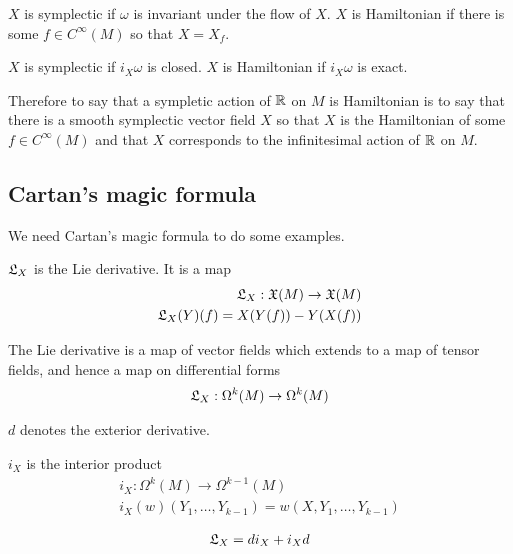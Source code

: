 \documentclass[12pt]{article}
\begin{document}
\begin{definition}
	$X$ is symplectic if $\omega$ is invariant under the flow of $X$.
	$X$ is Hamiltonian if there is some $f\in C^\infty(M)$ so that $X = X_f$.
\end{definition}

\begin{proposition}
	$X$ is symplectic if $i_X\omega$ is closed. $X$ is Hamiltonian if $i_X\omega$ is exact.
\end{proposition}
Therefore to say that a sympletic action of $\mathbb{R}$ on $M$ is Hamiltonian
is to say that there is a smooth symplectic vector field $X$ so that $X$ is the
Hamiltonian of some $f\in C^\infty(M)$ and that $X$ corresponds to the infinitesimal
action of $\mathbb{R}$ on $M$.

\subsection{Cartan's magic formula}
We need Cartan's magic formula to do some examples.

\begin{definition}
	$\mathfrak{L}_X$ is the Lie derivative. It is a map \begin{align*}
		\mathfrak{L}_X:\mathfrak{X}(M)\to \mathfrak{X}(M) \\
		\mathfrak{L}_X(Y)(f) = X(Y(f)) - Y(X(f))
	\end{align*}
\end{definition}

The Lie derivative is a map of vector fields which extends to a map of tensor fields,
and hence a map on differential forms \begin{align*}
	\mathfrak{L}_X:\Omega^k(M)\to \Omega^k(M)
\end{align*}

$d$ denotes the exterior derivative.

\begin{definition}
	$i_X$ is the interior product \begin{align*}
		i_X:\Omega^k(M)\to \Omega^{k-1}(M) \\
		i_X(w)(Y_1,\dots,Y_{k-1}) = w(X,Y_1,\dots,Y_{k-1})
	\end{align*}
\end{definition}

\begin{theorem}
	 \begin{align*}
		\mathfrak{L}_X = di_X + i_Xd
	\end{align*}
\end{theorem}
\end{document}
